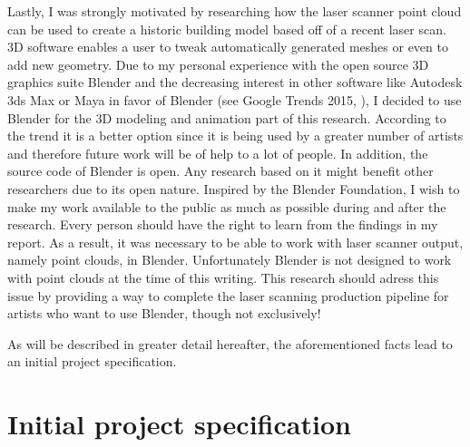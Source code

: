 Lastly, I was strongly motivated by researching how the laser scanner point cloud can be used to create a historic building model based off of a recent laser scan. 3D software enables a user to tweak automatically generated meshes or even to add new geometry. Due to my personal experience with the open source 3D graphics suite Blender and the decreasing interest in other software like Autodesk 3ds Max or Maya in favor of Blender (see Google Trends 2015, \parencite{Interest3DSoftware}), I decided to use Blender for the 3D modeling and animation part of this research. According to the trend it is a better option since it is being used by a greater number of artists and therefore future work will be of help to a lot of people. In addition, the source code of Blender is open. Any research based on it might benefit other researchers due to its open nature. Inspired by the Blender Foundation, I wish to make my work available to the public as much as possible during and after the research. Every person should have the right to learn from the findings in my report. As a result, it was necessary to be able to work with laser scanner output, namely point clouds, in Blender. Unfortunately Blender is not designed to work with point clouds at the time of this writing. This research should adress this issue by providing a way to complete the laser scanning production pipeline for artists who want to use Blender, though not exclusively!

As will be described in greater detail hereafter, the aforementioned facts lead to an initial project specification. 

\section{Initial project specification}

